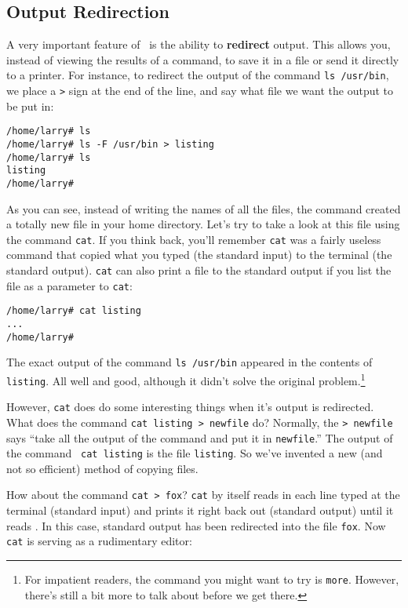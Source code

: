\subsection{Output Redirection}

A very important feature of \unix\ is the ability to {\bf redirect}
output. This allows you, instead of viewing the results of a command,
to save it in a file or send it directly to a printer. For instance,
to redirect the output of the command {\tt ls /usr/bin}, we place a
{\tt >} sign at the end of the line, and say what file we want the
output to be put in:

\begin{screen}\begin{verbatim}
/home/larry# ls
/home/larry# ls -F /usr/bin > listing
/home/larry# ls
listing
/home/larry#
\end{verbatim}\end{screen}

As you can see, instead of writing the names of all the files, the
command created a totally new file in your home directory. Let's try
to take a look at this file using the command {\tt cat}. If you think
back, you'll remember {\tt cat} was a fairly useless command that
copied what you typed (the standard input) to the terminal (the
standard output). {\tt cat} can also print a file to the standard
output if you list the file as a parameter to {\tt cat}:

\begin{screen}\begin{verbatim}
/home/larry# cat listing
...
/home/larry#
\end{verbatim}\end{screen}

The exact output of the command {\tt ls /usr/bin} appeared in the
contents of {\tt listing}. All well and good, although it didn't solve
the original problem.\footnote{For impatient readers, the command you
  might want to try is {\tt more}. However, there's still a bit more
  to talk about before we get there.}

However, {\tt cat} does do some interesting things when it's output is
redirected. What does the command {\tt cat listing > newfile} do?
Normally, the {\tt > newfile} says ``take all the output of the
command and put it in {\tt newfile}.'' The output of the command {\tt
  cat listing} is the file {\tt listing}. So we've invented a new (and
not so efficient) method of copying files.

How about the command {\tt cat > fox}? {\tt cat} by itself reads in
each line typed at the terminal (standard input) and prints it right
back out (standard output) until it reads . In this case,
standard output has been redirected into the file {\tt fox}. Now {\tt
  cat} is serving as a rudimentary editor:

